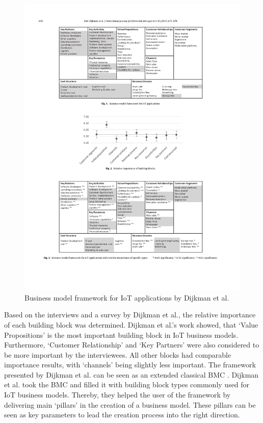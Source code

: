 		\begin{figure}[ht]
			\begin{center}
		    \includegraphics[scale=1.1]{Talk11/iot_canvas_dijkman.pdf}
		    \end{center}
		    \caption{Business model framework for IoT applications by Dijkman et al. \cite{dijkman}}
		    \label{fig:bm_dijkman}
		\end{figure}
		Based on the interviews and a survey by Dijkman et al., the relative importance of each building block was determined. Dijkman et al.'s work showed, that `Value Propositions' is the most important building block in IoT business models. Furthermore, `Customer Relationship' and `Key Partners' were also considered to be more important by the interviewees. All other blocks had comparable importance results, with `channels' being slightly less important. The framework presented by Dijkman et al. can be seen as an extended classical BMC \cite{bmc}. Dijkman et al. took the BMC and filled it with building block types commonly used for IoT business models. Thereby, they helped the user of the framework by delivering main `pillars' in the creation of a business model. These pillars can be seen as key parameters to lead the creation process into the right direction. 
	\vspace{-2em}
